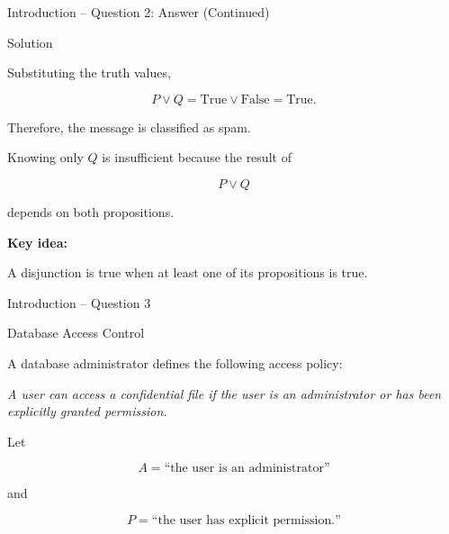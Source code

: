 \begin{frame}{Introduction -- Question 2: Answer (Continued)}

\begin{exampleblock}{Solution}

Substituting the truth values,

\[
P\lor Q
=
\mathrm{True}\lor\mathrm{False}
=
\mathrm{True}.
\]

Therefore, the message is classified as spam.

\medskip

Knowing only $Q$ is insufficient because the result of

\[
P\lor Q
\]

depends on both propositions.

\medskip

\textbf{Key idea:}

A disjunction is true when at least one of its propositions is true.

\end{exampleblock}

\end{frame}


\begin{frame}{Introduction -- Question 3}

\begin{block}{Database Access Control}

A database administrator defines the following access policy:

\begin{center}
\textit{A user can access a confidential file if the user is an administrator
or has been explicitly granted permission.}
\end{center}

Let

\[
A=\text{``the user is an administrator''}
\]

and

\[
P=\text{``the user has explicit permission.''}
\]

\end{block}

\end{frame}


